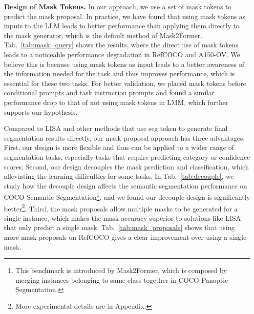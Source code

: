 \noindent\textbf{Design of Mask Tokens.}
In our approach, we use a set of mask tokens to predict the mask proposal. In practice, we have found that using mask tokens as inputs to the LLM leads to better performance than applying them directly to the mask generator, which is the default method of Mask2Former. Tab.~\ref{tab:mask_query} shows the results, where the direct use of mask tokens leads to a noticeable performance degradation in RefCOCO and A150-OV. 
We believe this is because using mask tokens as input leads to a better awareness of the information needed for the task and thus improves performance, which is essential for these two tasks. For better validation, we placed mask tokens before conditional prompts and task instruction prompts and found a similar performance drop to that of not using mask tokens in LMM, which further supports our hypothesis.

Compared to LISA and other methods that use seg token to generate final segmentation results directly, our mask proposal approach has three advantages: First, our design is more flexible and thus can be applied to a wider range of segmentation tasks, especially tasks that require predicting category or confidence scores; Second, our design decouples the mask prediction and classification, which alleviating the learning difficulties for some tasks. In Tab.~\ref{tab:decouple}, we study how the decouple design affects the semantic segmentation performance on COCO Semantic Segmentation\footnote{This benchmark is introduced by Mask2Former, which is composed by merging instances belonging to same class together in COCO Panoptic Segmentation.}, and we found our decouple design is significantly better\footnote{More experimental details are in Appendix.}. Third, the mask proposals allow multiple masks to be generated for a single instance, which makes the mask accuracy superior to solutions like LISA that only predict a single mask. Tab.~\ref{tab:mask_proposals} shows that using more mask proposals on RefCOCO gives a clear improvement over using a single mask.

